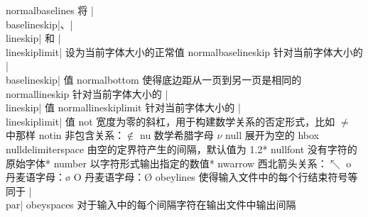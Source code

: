 \capcs normalbaselines {将 |\\baselineskip|、|\\line\-skip| 和 |\\line\-skip\-limit| 设为当前字体大小的正常值}{}{}
\capcs normalbaselineskip {针对当前字体大小的 |\\baselineskip| 值}{}{}
\capcs normalbottom {使得底边距从一页到另一页是相同的}{}{}
\capcs normallineskip {针对当前字体大小的 |\\lineskip| 值}{}{}
\capcs normallineskiplimit {针对当前字体大小的  |\\lineskiplimit| 值}{}{}
\capcs not {宽度为零的斜杠，用于构建数学关系的否定形式，比如 $\not=$ 中那样}{}{}
\capcs notin {非包含关系：$\notin$}{}{}
\capcs nu {数学希腊字母 $\nu$}{}{}
\capcs null {展开为空的 hbox}{}{}
\capcs nulldelimiterspace {由空的定界符产生的间隔，默认值为 1.2\pt}*{}
\capcs nullfont {没有字符的原始字体}*{}
\capcs number {以字符形式输出指定的数值}*{}
\capcs nwarrow {西北箭头关系：$\nwarrow$}{}{}
%
\capcs o {丹麦语字母：\o}{}{}
\capcs O {丹麦语字母：\O}{}{}
\capcs obeylines {使得输入文件中的每个行结束符号等同于 |\\par|}{}{}
\capcs obeyspaces {对于输入中的每个间隔字符在输出文件中输出间隔}{}{}

